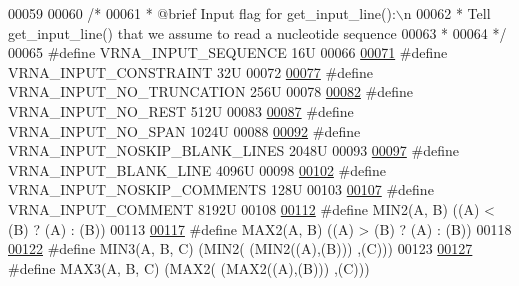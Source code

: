 \begin{DoxyCode}
00059 
00060 \textcolor{comment}{/*}
00061 \textcolor{comment}{ *  @brief  Input flag for get\_input\_line():\(\backslash\)n}
00062 \textcolor{comment}{ *  Tell get\_input\_line() that we assume to read a nucleotide sequence}
00063 \textcolor{comment}{ * }
00064 \textcolor{comment}{ */}
00065 \textcolor{preprocessor}{#define VRNA\_INPUT\_SEQUENCE               16U}
00066 
\hypertarget{utils_8h_source.tex_l00071}{}\hyperlink{group__utils_gac08a9df45b9721b97a47dbfe7a6e5f85}{00071} \textcolor{preprocessor}{#define VRNA\_INPUT\_CONSTRAINT             32U}
00072 
\hypertarget{utils_8h_source.tex_l00077}{}\hyperlink{group__utils_ga086742158293217a46ae2f71bb296937}{00077} \textcolor{preprocessor}{#define VRNA\_INPUT\_NO\_TRUNCATION          256U}
00078 
\hypertarget{utils_8h_source.tex_l00082}{}\hyperlink{group__utils_ga7a2e8c50a0c7ce82e60da1016e1367fd}{00082} \textcolor{preprocessor}{#define VRNA\_INPUT\_NO\_REST                512U}
00083 
\hypertarget{utils_8h_source.tex_l00087}{}\hyperlink{group__utils_ga0de536599b881c787b0943a2671da476}{00087} \textcolor{preprocessor}{#define VRNA\_INPUT\_NO\_SPAN                1024U}
00088 
\hypertarget{utils_8h_source.tex_l00092}{}\hyperlink{group__utils_gab4db885222b3b69608310d7c7e63e286}{00092} \textcolor{preprocessor}{#define VRNA\_INPUT\_NOSKIP\_BLANK\_LINES     2048U}
00093 
\hypertarget{utils_8h_source.tex_l00097}{}\hyperlink{group__utils_ga305474b93ccb79ae4c7754016a8ddd84}{00097} \textcolor{preprocessor}{#define VRNA\_INPUT\_BLANK\_LINE             4096U}
00098 
\hypertarget{utils_8h_source.tex_l00102}{}\hyperlink{group__utils_ga0f6311f11bed1842e3a527ab27b294c6}{00102} \textcolor{preprocessor}{#define VRNA\_INPUT\_NOSKIP\_COMMENTS        128U}
00103 
\hypertarget{utils_8h_source.tex_l00107}{}\hyperlink{group__utils_gaf2062e0eeefffd3ed639af460b3d4fab}{00107} \textcolor{preprocessor}{#define VRNA\_INPUT\_COMMENT                8192U}
00108 
\hypertarget{utils_8h_source.tex_l00112}{}\hyperlink{group__utils_ga2dd4a927a7f937f43a90c144d79107d8}{00112} \textcolor{preprocessor}{#define MIN2(A, B)      ((A) < (B) ? (A) : (B))}
00113 
\hypertarget{utils_8h_source.tex_l00117}{}\hyperlink{group__utils_gadd91367918fadbc8d585940d6206d6d2}{00117} \textcolor{preprocessor}{#define MAX2(A, B)      ((A) > (B) ? (A) : (B))}
00118 
\hypertarget{utils_8h_source.tex_l00122}{}\hyperlink{group__utils_gafb23911b91805692382004ab5441f47c}{00122} \textcolor{preprocessor}{#define MIN3(A, B, C)   (MIN2(  (MIN2((A),(B))) ,(C)))}
00123 
\hypertarget{utils_8h_source.tex_l00127}{}\hyperlink{group__utils_ga27c2f8e6ef48853a348897da2ef8e7f8}{00127} \textcolor{preprocessor}{#define MAX3(A, B, C)   (MAX2(  (MAX2((A),(B))) ,(C)))}

\end{DoxyCode}
